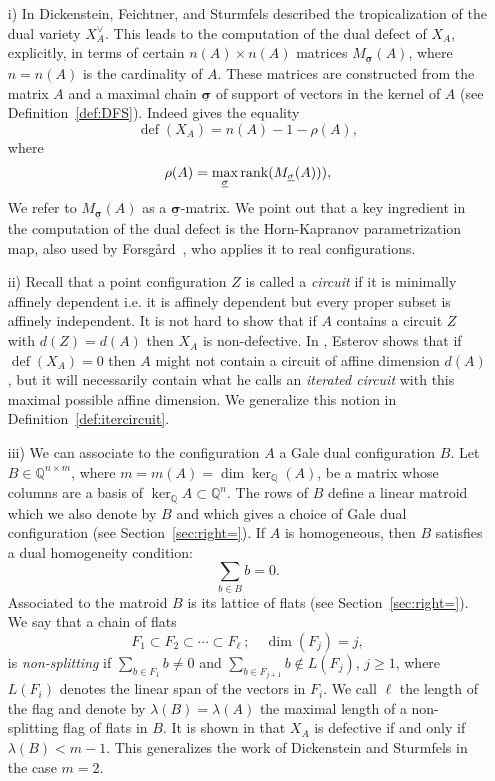 \documentclass[11pt]{amsart}
\theoremstyle{plain}
\theoremstyle{definition}
\theoremstyle{remark}
\newcommand{\defect}{{\operatorname {def}}}
\newcommand{\baseRing}[1]{\ensuremath{\mathbb{#1}}}
\newcommand{\Q}{\baseRing{Q}}
\newcommand{\beq}{\begin{equation}}
\newcommand{\eeq}{\end{equation}}
\newcommand{\csig}{\ensuremath{\underline{\mathbf \sigma}}}
\numberwithin{equation}{section}
\begin{document}
\begin{enumerate}
\item[i)] 
In \cite{DFS} Dickenstein, Feichtner, and Sturmfels described the tropicalization of the dual variety $X_A^\vee$. 
This leads to the computation of the dual defect of $X_A$, explicitly, 
in terms of certain $n(A)\times n(A)$ matrices $M_{\csig}(A)$, where $n=n(A)$ is the cardinality of $A$. 
These matrices are constructed from the matrix $A$ and a maximal chain $\csig$ 
of support of vectors in the kernel of $A$ (see Definition~\ref{def:DFS}).  Indeed \cite[Corollary~4.5]{DFS} gives the equality 
\beq\label{eq:defect_rho}
\defect(X_A) = n(A) - 1 - \rho(A),
\eeq
 where 
$$
 \rho(A) = \max_{\csig} {\rm rank} (M_{\csig}(A))),
$$
We refer to $M_{\csig}(A)$ as a ${\csig}$-matrix.  We point out that a key ingredient in the computation of the dual 
defect is the Horn-Kapranov parametrization map, also used by Forsg{\aa}rd~\cite{Fo}, who applies it to real configurations.

\medskip

\item[ii)] Recall that a point configuration $Z$ is called a \emph{circuit}  if it is minimally affinely dependent 
i.e. it is affinely dependent but every proper subset is affinely independent. It is not hard to show that if $A$ contains a circuit $Z$ with $d(Z)=d(A)$ then $X_A$ is non-defective.  
In \cite{E2}, Esterov shows that if $\defect(X_A) =0$ then $A$ might not contain a circuit of  affine dimension $d(A)$, 
but it will necessarily contain what he calls an {\em iterated circuit} 
with this maximal possible affine dimension. We generalize this notion in Definition~\ref{def:itercircuit}.

\medskip

\item[iii)] We can associate to the configuration $A$ a Gale dual configuration $B$.
Let $B \in \Q^{n \times m}$, where $m=m(A) = \dim \ker_\Q(A)$, be a matrix whose columns 
are a basis of $\ker_\Q A \subset \Q^n$. The rows of $B$ define a linear 
matroid which we also denote by $B$ and which gives a choice of Gale dual configuration (see Section~\ref{sec:right=}). 
If $A$ is homogeneous, then $B$ satisfies a dual homogeneity condition:
$$\sum_{b\in B} b = 0.$$
Associated to the matroid $B$ is its lattice of flats  (see Section~\ref{sec:right=}).  We say that a chain of flats
$$F_1 \subset F_2 \subset \cdots \subset F_\ell\ ;\quad \dim(F_j) = j,$$ 
is {\em non-splitting} if $\sum_{b\in F_1} b \not=0$ and 
$\sum_{b\in F_{j+1}} b \not\in L(F_j)$, $j\geq 1$,
where $L(F_i)$ denotes the  linear span of the vectors in $F_i$.  We call $\ell$ the length of the flag and 
denote by $\lambda(B)= \lambda(A)$ the maximal length of a  non-splitting flag of flats in $B$.  
It is shown in \cite{CC} that $X_A$ is defective if and only if $\lambda(B) < m -1$.   
This generalizes the work of Dickenstein and Sturmfels \cite{DS} in the case $m=2$.



\end{enumerate}
\end{document}
